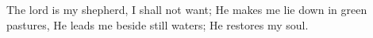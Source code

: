 \beginnarrowtext 1in
\eightpoint
\obeylines
The lord is my shepherd, I shall not want;
He makes me lie down in green pastures,
He leads me beside still waters;
He restores my soul.
\endnarrowtext
\done
 
 
